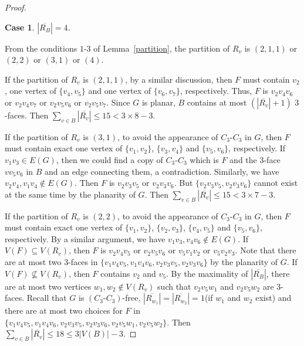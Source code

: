 \documentclass[12pt]{article}
\newtheorem{case}{Case}[section]
\begin{document}
\begin{proof}
    \begin{case} 
        $|\overline{R_B}|=4$.
    \end{case}
    
    From the conditions $1$-$3$ of Lemma~\ref{partition}, the partition of $R_v$ is $(2,1,1)$ or $(2,2)$ or $(3,1)$ or $(4)$.
    
    If the partition of $R_v$ is $(2,1,1)$, by a similar discussion, then $F$ must contain $v_2$, one vertex of $\{v_4,v_5\}$ and one vertex of $\{v_6,v_7\}$, respectively. Thus, $F$ is $v_2v_4v_6$ or $v_2v_4v_7$ or $v_2v_5v_6$ or $v_2v_5v_7$. Since $G$ is planar, $B$ contains at most $(|\overline{R_v}|+1)$ $3$-faces. Then $\sum_{v \in B}|\overline{R_v}| \leq 15 < 3\times8-3$.

    If the partition of $R_v$ is $(3,1)$, to avoid the appearance of $C_3\textbf{-}C_3$ in $G$, then $F$ must contain exact one vertex of $\{v_1,v_2\}$, $\{v_3,v_4\}$ and $\{v_5,v_6\}$, respectively. If $v_1v_3\in E(G)$, then we could find a copy of $C_3\textbf{-}C_3$ which is $F$ and the $3$-face $vv_5v_6$ in $B$ and an edge connecting them, a contradiction. Similarly, we have $v_2v_4, v_1v_4\notin E(G)$. Then $F$ is $v_2v_3v_5$ or $v_2v_3v_6$. But $\{v_2v_3v_5, v_2v_3v_6\}$ cannot exist at the same time by the planarity of $G$. Then $\sum_{v \in B}|\overline{R_v}| \leq 15 < 3\times7-3$.

    If the partition of $R_v$ is $(2,2)$, to avoid the appearance of $C_3\textbf{-}C_3$ in $G$, then $F$ must contain exact one vertex of $\{v_1,v_2\}$, $\{v_2,v_3\}$, $\{v_4,v_5\}$ and $\{v_5,v_6\}$, respectively. By a similar argument, we have $v_1v_3, v_4v_6\notin E(G)$. If $V(F)\subseteq V(R_v)$, then $F$ is $v_2v_4v_5$ or $v_2v_5v_6$ or $v_5v_1v_2$ or $v_5v_2v_3$. Note that there are at most two $3$-faces in $\{v_1v_4v_5, v_1v_4v_6, v_2v_3v_5, v_2v_3v_6\}$ by the planarity of $G$. If $V(F)\not\subseteq V(R_v)$, then $F$ contains $v_2$ and $v_5$. By the maximality of $|\overline{R_B}|$, there are at most two vertices $w_1,w_2\notin V(R_v)$ such that $v_2v_5w_1$ and $v_2v_5w_2$ are $3$-faces. Recall that $G$ is $(C_3\textbf{-}C_3)$-free, $|\overline{R_{w_1}}|=|\overline{R_{w_2}}|=1$(if $w_1$ and $w_2$ exist) and there are at most two choices for $F$ in $\{v_1v_4v_5, v_1v_4v_6, v_2v_3v_5, v_2v_3v_6, v_2v_5w_1, v_2v_5w_2 \}$. Then $\sum_{v \in B}|\overline{R_v}| \leq 18 \leq 3|V(B)|-3$.


\end{proof}
\end{document}
